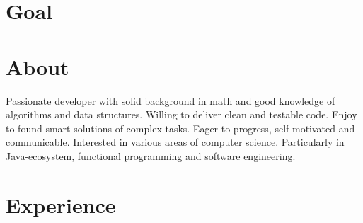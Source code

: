 \documentclass[11pt,a4paper,sans]{moderncv} %
\def\Ruble{\stackengine{.64ex}{%
  \stackengine{.4ex}{\textbf{\textsf{P}}}{\rule{1ex}{.16ex}\kern.55ex}{O}{r}{F}{F}{L}%
  }{\rule{1ex}{.16ex}\kern.55ex}{O}{r}{F}{F}{L}\kern-.1ex}
\begin{document}
\makecvtitle %

\section{Goal}


\section{About}
Passionate developer with solid background in math and good knowledge of algorithms and data structures. Willing to deliver clean and testable code. Enjoy to found smart solutions of complex tasks. Eager to progress, self-motivated and communicable. Interested in various areas of computer science. Particularly in Java-ecosystem, functional programming and software engineering.


\section{Experience}
\end{document}
